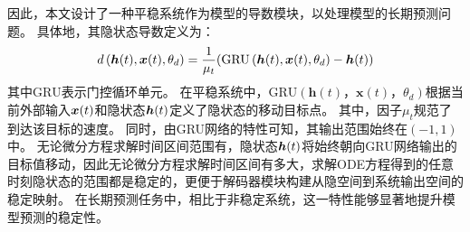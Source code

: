 因此，本文设计了一种平稳系统作为模型的导数模块，以处理模型的长期预测问题。
具体地，其隐状态导数定义为：
\begin{equation}
\label{equ:stationary}
d\left(\boldsymbol{h}(t), \boldsymbol{x}(t), \theta_{d}\right)=\frac{1}{\mu _t}(\text{GRU}\left(\boldsymbol{h}(t), \boldsymbol{x}(t), \theta_{d}\right)-\boldsymbol h(t))
\end{equation}
其中$\text{GRU}$表示门控循环单元。
在平稳系统中，$\text{GRU}\left(\boldsymbol{h}(t)， \boldsymbol{x}(t)， \theta_{d}\right)$根据当前外部输入$\boldsymbol x(t)$和隐状态$\boldsymbol h(t)$定义了隐状态的移动目标点。
其中，因子$\mu_t$规范了到达该目标的速度。
同时，由GRU网络的特性可知，其输出范围始终在$(-1,1)$中。
无论微分方程求解时间区间范围有，隐状态$\boldsymbol h (t)$将始终朝向GRU网络输出的目标值移动，因此无论微分方程求解时间区间有多大，求解ODE方程得到的任意时刻隐状态的范围都是稳定的，更便于解码器模块构建从隐空间到系统输出空间的稳定映射。
在长期预测任务中，相比于非稳定系统，这一特性能够显著地提升模型预测的稳定性。

